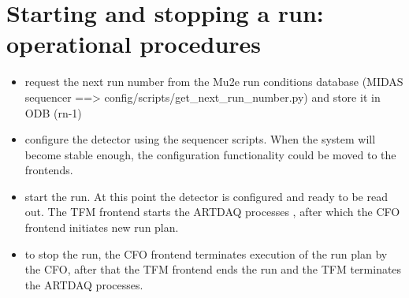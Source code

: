 \section{Starting and stopping a run: operational procedures }

\begin{itemize}
\item
  request the next run number from the Mu2e run conditions database
  (MIDAS sequencer ==> config/scripts/get\_next\_run\_number.py) and store
  it in ODB (rn-1)
\item
  configure the detector using the sequencer scripts.
  When the system will become stable enough, the configuration functionality
  could be moved to the frontends.
\item
  start the run. At this point the detector is configured and ready to be read out.
  The TFM frontend starts the ARTDAQ processes , after which the CFO frontend 
  initiates new run plan.
\item
  to stop the run, the CFO frontend terminates execution of the run plan
  by the CFO, after that the TFM frontend ends the run and the TFM terminates
  the ARTDAQ processes.
\end{itemize}

